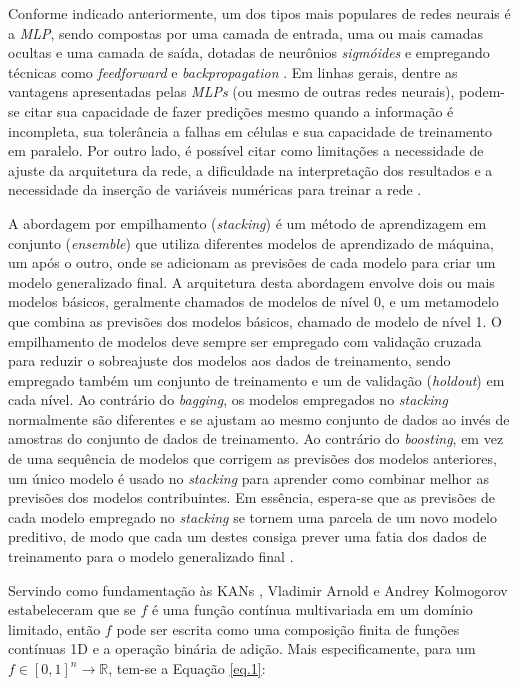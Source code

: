 \documentclass[journal]{IEEEtran}
\begin{document}
Conforme indicado anteriormente, um dos tipos mais populares de redes neurais é a \textit{MLP}, sendo compostas por uma camada de entrada, uma ou mais camadas ocultas e uma camada de saída, dotadas de neurônios \textit{sigmóides} e empregando técnicas como \textit{feedforward} e \textit{backpropagation} \cite{ibm}. Em linhas gerais, dentre as vantagens apresentadas pelas \textit{MLPs} (ou mesmo de outras redes neurais), podem-se citar sua capacidade de fazer predições mesmo quando a informação é incompleta, sua tolerância a falhas em células e sua capacidade de treinamento em paralelo. Por outro lado, é possível citar como limitações a necessidade de ajuste da arquitetura da rede, a dificuldade na interpretação dos resultados e a necessidade da inserção de variáveis numéricas para treinar a rede \cite{khalilov}.

A abordagem por empilhamento (\textit{stacking}) é um método de aprendizagem em conjunto (\textit{ensemble}) que utiliza diferentes modelos de aprendizado de máquina, um após o outro, onde se adicionam as previsões de cada modelo para criar um modelo generalizado final. A arquitetura desta abordagem envolve dois ou mais modelos básicos, geralmente chamados de modelos de nível 0, e um metamodelo que combina as previsões dos modelos básicos, chamado de modelo de nível 1. O empilhamento de modelos deve sempre ser empregado com validação cruzada para reduzir o sobreajuste dos modelos aos dados de treinamento, sendo empregado também um conjunto de treinamento e um de validação (\textit{holdout}) em cada nível. Ao contrário do \textit{bagging}, os modelos empregados no \textit{stacking} normalmente são diferentes e se ajustam ao mesmo conjunto de dados ao invés de amostras do conjunto de dados de treinamento. Ao contrário do \textit{boosting}, em vez de uma sequência de modelos que corrigem as previsões dos modelos anteriores, um único modelo é usado no \textit{stacking} para aprender como combinar melhor as previsões dos modelos contribuintes. Em essência, espera-se que as previsões de cada modelo empregado no \textit{stacking} se tornem uma parcela de um novo modelo preditivo, de modo que cada um destes consiga prever uma fatia dos dados de treinamento para o modelo generalizado final \cite{ibm2020, brownlee}.

Servindo como fundamentação às KANs \cite{liu}, Vladimir Arnold \cite{arnold} e Andrey Kolmogorov \cite{kolmogorov} estabeleceram que se $f$ é uma função contínua multivariada em um domínio limitado, então $f$ pode ser escrita como uma composição finita de funções contínuas 1D e a operação binária de adição. Mais especificamente, para um $f \in [0,1]^n \rightarrow \mathbb{R} $, tem-se a Equação \ref{eq.1}:
\end{document}
